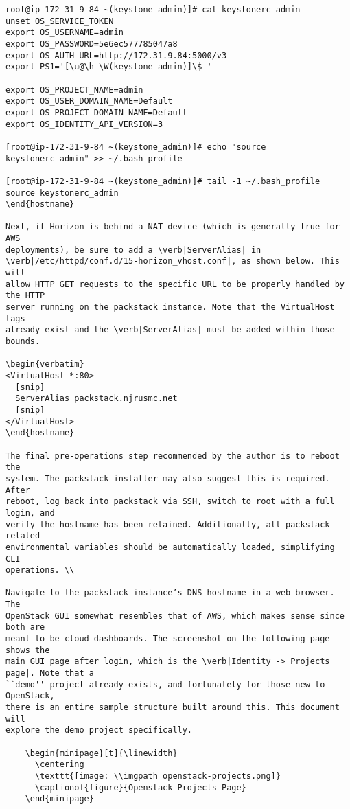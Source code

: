 \begin{verbatim}
root@ip-172-31-9-84 ~(keystone_admin)]# cat keystonerc_admin
unset OS_SERVICE_TOKEN
export OS_USERNAME=admin
export OS_PASSWORD=5e6ec577785047a8
export OS_AUTH_URL=http://172.31.9.84:5000/v3
export PS1='[\u@\h \W(keystone_admin)]\$ '

export OS_PROJECT_NAME=admin
export OS_USER_DOMAIN_NAME=Default
export OS_PROJECT_DOMAIN_NAME=Default
export OS_IDENTITY_API_VERSION=3

[root@ip-172-31-9-84 ~(keystone_admin)]# echo "source keystonerc_admin" >> ~/.bash_profile

[root@ip-172-31-9-84 ~(keystone_admin)]# tail -1 ~/.bash_profile
source keystonerc_admin
\end{hostname}

Next, if Horizon is behind a NAT device (which is generally true for AWS
deployments), be sure to add a \verb|ServerAlias| in
\verb|/etc/httpd/conf.d/15-horizon_vhost.conf|, as shown below. This will
allow HTTP GET requests to the specific URL to be properly handled by the HTTP
server running on the packstack instance. Note that the VirtualHost tags
already exist and the \verb|ServerAlias| must be added within those bounds.

\begin{verbatim}
<VirtualHost *:80>
  [snip]
  ServerAlias packstack.njrusmc.net
  [snip]
</VirtualHost>
\end{hostname}

The final pre-operations step recommended by the author is to reboot the
system. The packstack installer may also suggest this is required. After
reboot, log back into packstack via SSH, switch to root with a full login, and
verify the hostname has been retained. Additionally, all packstack related
environmental variables should be automatically loaded, simplifying CLI
operations. \\

Navigate to the packstack instance’s DNS hostname in a web browser. The
OpenStack GUI somewhat resembles that of AWS, which makes sense since both are
meant to be cloud dashboards. The screenshot on the following page shows the
main GUI page after login, which is the \verb|Identity -> Projects page|. Note that a
``demo'' project already exists, and fortunately for those new to OpenStack,
there is an entire sample structure built around this. This document will
explore the demo project specifically.

    \begin{minipage}[t]{\linewidth}
	  \centering
      \texttt{[image: \\imgpath openstack-projects.png]}
      \captionof{figure}{Openstack Projects Page}
    \end{minipage}


\end{verbatim}
